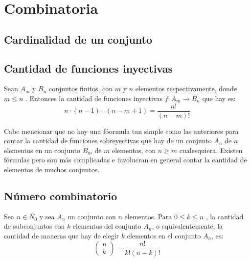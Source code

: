 \documentclass[../main.tex]{subfiles}
\begin{document}
\section{Combinatoria} {
    \subsection{Cardinalidad de un conjunto} {
        
    }
    
    \subsection{Cantidad de funciones inyectivas} {
        \cite{teresa} Sean $A_m$ y $B_n$ conjuntos finitos, con $m$ y $n$ elementos respectivamente, donde $m \leq n$ . Entonces la cantidad de funciones inyectivas $f : A_m \rightarrow B_n$
        que hay es:
            \begin{equation*}
                n \cdot (n-1) \cdots (n-m+1) = \frac{n!}{(n-m)!}
            \end{equation*}
            
        Cabe mencionar que no hay una fóormula tan simple como las anteriores para
        contar la cantidad de funciones sobreyectivas que hay de un conjunto $A_n$ de
        $n$ elementos en un conjunto $B_m$ de $m$ elementos, con $n \geq m$ cualesquiera.
        Existen fórmulas pero son más complicadas e involucran en general
        contar la cantidad de elementos de muchos conjuntos.
    } \label{cantidad_inyectivas}
    
    \subsection{Número combinatorio} {
        Sea $n \in N_0$ y sea $A_n$ un conjunto con $n$ elementos. Para $0 \leq k \leq n$ , la
        cantidad de subconjuntos con $k$ elementos del conjunto $A_n$, o  equivalentemente, la cantidad de maneras que hay de elegir $k$ elementos en el conjunto $A_n$, es:
            \begin{equation*}
                \begin{pmatrix} n\\k \end{pmatrix} = \frac{n!}{k!(n-k)!}
            \end{equation*}
            
}}
\end{document}
